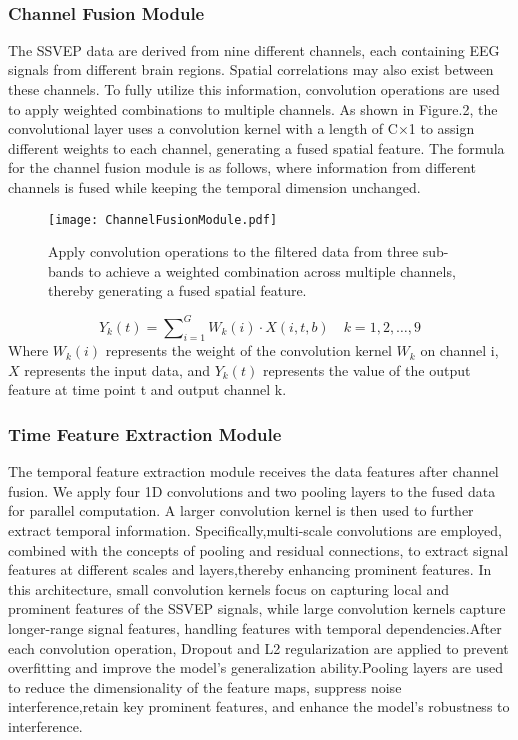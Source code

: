 \documentclass[10pt]{iopart}
\begin{document}
‌\subsubsection{Channel Fusion Module\\}
The SSVEP data are derived from nine different channels, each containing EEG signals from different brain regions. Spatial
correlations may also exist between these channels. To fully utilize this information, convolution operations are used to apply weighted combinations to multiple channels\cite{lin2006frequency}. As shown in Figure.2, the convolutional layer uses a convolution kernel with a length of C×1 to assign different weights to each channel, generating a fused spatial feature. The formula for the channel fusion module is as follows, where information from different channels is fused while keeping the temporal dimension unchanged.
\begin{figure}[ht]
    \centering
    \texttt{[image: ChannelFusionModule.pdf]}
    \caption{Apply convolution operations to the filtered data from three sub-bands to achieve a weighted combination across multiple channels, thereby generating a fused spatial feature.}
\end{figure}
\begin{equation}
Y_k (t) = \sum\nolimits_{i=1}^{G} W_k(i) \cdot X(i,t,b) \quad k=1,2,\ldots,9
\end{equation}
Where $W_k(i) $ represents the weight of the convolution kernel $W_k $ on channel i, $X $ represents the input data, and $Y_k (t) $ represents the value of the output feature at time point t and output channel k.
‌\subsubsection{Time Feature Extraction Module\\}
The temporal feature extraction module receives the data features after channel fusion. We apply four 1D convolutions and two pooling layers to the fused data for parallel computation. A larger convolution kernel is then used to further extract temporal information. Specifically,multi-scale convolutions are employed, combined with the concepts of pooling and residual connections, to extract signal features at different scales and layers,thereby enhancing prominent features. In this architecture, small convolution kernels focus on capturing local and prominent features of the SSVEP signals, while large convolution kernels capture longer-range signal features, handling features with temporal dependencies.After each convolution operation, Dropout and L2 regularization are applied to prevent overfitting and improve the model's generalization ability.Pooling layers are used to reduce the dimensionality of the feature maps, suppress noise interference,retain key prominent features, and enhance the model's robustness to interference.
\end{document}
